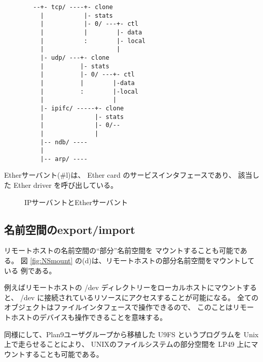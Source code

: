 \documentclass{jarticle}
\begin{document}
{\footnotesize
\begin{verbatim}
        --+- tcp/ ----+- clone                        
          |           |- stats                
          |           |- 0/ ---+- ctl          
          |           |        |- data     
          |           :        |- local    
          |                    |           
          |- udp/ ---+- clone                        
          |          |- stats                  
          |          |- 0/ ---+- ctl            
          |          |        |-data     
          |          :        |-local    
          |                   |           
          |- ipifc/ -----+- clone                         
          |              |- stats                   
          |              |- 0/--                    
          |              |                          
          |-- ndb/ ----                                   
          |                                              
          |-- arp/ ----
\end{verbatim}
}


Etherサーバント(\#l)は、 Ether card のサービスインタフェースであり、
該当した Ether driver を呼び出している。


\begin{figure}[htb]
  \begin{center}
   \epsfxsize=360pt
    \caption{IPサーバントとEtherサーバント}
    \label{fig:NWservants}
  \end{center}
\end{figure}


\subsection{名前空間のexport/import}

  
リモートホストの名前空間の``部分''名前空間を
マウントすることも可能である。
図 \ref{fig:NSmount} の(d)は、リモートホストの部分名前空間をマウントしている
例である。

例えばリモートホストの /dev ディレクトリーをローカルホストにマウントすると、
/dev に接続されているリソースにアクセスすることが可能になる。
全てのオブジェクトはファイルインタフェースで操作できるので、
このことはリモートホストのデバイスも操作できることを意味する。


同様にして、Plan9ユーザグループから移植した U9FS というプログラムを
Unix上で走らせることにより、
UNIXのファイルシステムの部分空間を LP49 上にマウントすることも可能である。
\end{document}
